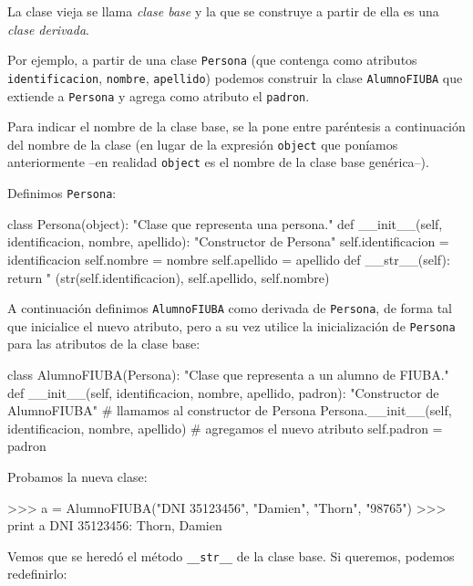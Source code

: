 La clase vieja se llama {\it clase base} y la que se construye a partir de
ella es una {\it clase derivada}.

Por ejemplo, a partir de una clase \lstinline!Persona! (que contenga como
atributos \lstinline!identificacion!, \lstinline!nombre!, \lstinline!apellido!)
podemos construir la clase \lstinline!AlumnoFIUBA! que extiende a
\lstinline!Persona! y agrega como atributo el \lstinline!padron!.

Para indicar el nombre de la clase base, se la pone entre paréntesis a
continuación del nombre de la clase (en lugar de la expresión
\lstinline!object! que poníamos anteriormente --en realidad \lstinline!object!
es el nombre de la clase base genérica--).

Definimos \lstinline!Persona!:
\begin{codigo-python-sn}
class Persona(object):
    "Clase que representa una persona."
    def __init__(self, identificacion, nombre, apellido):
        "Constructor de Persona"
        self.identificacion = identificacion
        self.nombre = nombre
        self.apellido = apellido
    def __str__(self):
        return "%
            (str(self.identificacion), self.apellido, self.nombre)
\end{codigo-python-sn}

A continuación definimos \lstinline!AlumnoFIUBA! como derivada de
\lstinline!Persona!, de forma tal que inicialice el nuevo atributo, pero a su
vez utilice la inicialización de \lstinline!Persona! para las atributos de la
clase base:

\begin{codigo-python-sn}
class AlumnoFIUBA(Persona):
    "Clase que representa a un alumno de FIUBA."
    def __init__(self, identificacion, nombre, apellido, padron):
        "Constructor de AlumnoFIUBA"
        # llamamos al constructor de Persona
        Persona.__init__(self, identificacion, nombre, apellido)
        # agregamos el nuevo atributo
        self.padron = padron
\end{codigo-python-sn}

Probamos la nueva clase:

\begin{codigo-python-sn}
>>> a = AlumnoFIUBA("DNI 35123456", "Damien", "Thorn", "98765")
>>> print a
DNI 35123456: Thorn, Damien
\end{codigo-python-sn}

Vemos que se heredó el método \lstinline+__str__+ de la clase base. Si
queremos, podemos redefinirlo:

